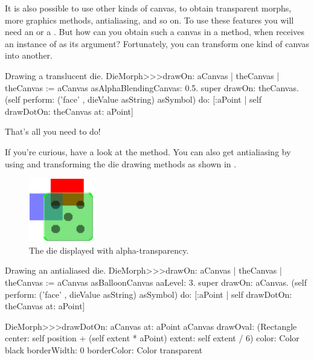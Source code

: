 \documentclass[a4paper,10pt,twoside]{book}
\begin{document}
It is also possible to use other kinds of canvas, to obtain transparent morphs, more graphics methods, antialiasing, and so on.
To use these features you will need an  or a .
But how can you obtain such a canvas in a  method, when  receives an instance of  as its argument?
Fortunately, you can transform one kind of canvas into another.

\begin{method}{Drawing a translucent die.}
DieMorph>>>drawOn: aCanvas
	| theCanvas |
	theCanvas := aCanvas asAlphaBlendingCanvas: 0.5.
	super drawOn: theCanvas.
	(self perform: ('face' , dieValue asString) asSymbol)
		do: [:aPoint | self drawDotOn: theCanvas at: aPoint]
\end{method}
\noindent
That's all you need to do!

If you're curious, have a look at the  method.
You can also get antialiasing by using  and transforming the die drawing methods as shown in .

\begin{figure}[ht]
	\centerline{\includegraphics[scale=0.7]{multiMorphs}}
	\caption{The die displayed with alpha-transparency.
		\label{fig:multiMorphs}}
\end{figure}

\begin{methods}[aadie]{Drawing an antialiased die.}
DieMorph>>>drawOn: aCanvas
	| theCanvas |
	theCanvas := aCanvas asBalloonCanvas aaLevel: 3.
	super drawOn: aCanvas.
	(self perform: ('face' , dieValue asString) asSymbol)
		do: [:aPoint | self drawDotOn: theCanvas at: aPoint]

DieMorph>>>drawDotOn: aCanvas at: aPoint
	aCanvas
		drawOval: (Rectangle
			center: self position + (self extent * aPoint)
			extent: self extent / 6)
		color: Color black
		borderWidth: 0
		borderColor: Color transparent
\end{methods}

\end{document}
